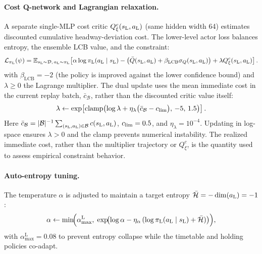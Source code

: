 \paragraph{Cost Q-network and Lagrangian relaxation.}
A separate single-MLP cost critic $Q^c_{\xi}(s_{\mathrm{L}}, a_{\mathrm{L}})$ (same hidden width 64) estimates discounted cumulative headway-deviation cost. The lower-level actor loss balances entropy, the ensemble LCB value, and the constraint:
{\footnotesize
\begin{equation}
\label{eq:lower_policy_loss}
    \mathcal{L}_{\pi_{\mathrm{L}}}(\psi) = \mathbb{E}_{s_{\mathrm{L}}\sim\mathcal{D},\,a_{\mathrm{L}}\sim\pi_{\mathrm{L}}}\!\left[\alpha\log\pi_{\mathrm{L}}(a_{\mathrm{L}}\mid s_{\mathrm{L}}) - \bigl(\bar{Q}(s_{\mathrm{L}},a_{\mathrm{L}})+\beta_{\mathrm{LCB}}\sigma_Q(s_{\mathrm{L}},a_{\mathrm{L}})\bigr) + \lambda Q^c_{\xi}(s_{\mathrm{L}},a_{\mathrm{L}})\right].
\end{equation}
}
with $\beta_{\mathrm{LCB}} = -2$ (the policy is improved against the lower confidence bound) and $\lambda \geq 0$ the Lagrange multiplier. The dual update uses the mean immediate cost in the current replay batch, $\bar{c}_{\mathcal{B}}$, rather than the discounted critic value itself:
\begin{equation}
\label{eq:lambda_update}
    \lambda \leftarrow \exp\!\left[\mathrm{clamp}\!\left(\log\lambda + \eta_{\lambda}\bigl(\bar{c}_{\mathcal{B}}-c_{\mathrm{lim}}\bigr),\,-5,\,1.5\right)\right].
\end{equation}
Here $\bar{c}_{\mathcal{B}}=|\mathcal{B}|^{-1}\sum_{(s_{\mathrm{L}},a_{\mathrm{L}})\in\mathcal{B}}c(s_{\mathrm{L}},a_{\mathrm{L}})$, $c_{\mathrm{lim}}=0.5$, and $\eta_{\lambda}=10^{-4}$.
Updating in log-space ensures $\lambda > 0$ and the clamp prevents numerical instability. The realized immediate cost, rather than the multiplier trajectory or $Q^c_{\xi}$, is the quantity used to assess empirical constraint behavior.

\paragraph{Auto-entropy tuning.}
The temperature $\alpha$ is adjusted to maintain a target entropy $\bar{\mathcal{H}} = -\dim(a_{\mathrm{L}}) = -1$:
\begin{equation}
\label{eq:alpha_update}
    \alpha \leftarrow \min\!\Bigl(\alpha_{\max}^{\mathrm{L}},\; \exp\!\bigl(\log\alpha - \eta_{\alpha}\,(\log \pi_{\mathrm{L}}(a_{\mathrm{L}} \mid s_{\mathrm{L}}) + \bar{\mathcal{H}})\bigr)\Bigr),
\end{equation}
with $\alpha_{\max}^{\mathrm{L}} = 0.08$ to prevent entropy collapse while the timetable and holding policies co-adapt.

